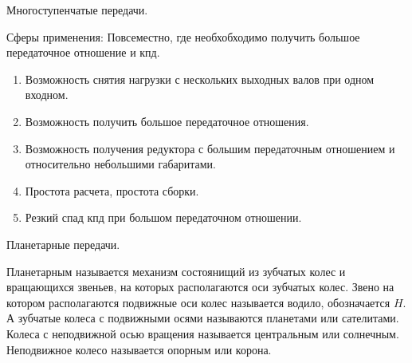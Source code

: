 \documentclass{article}
\begin{document}
Многоступенчатые передачи.

Сферы применения:
Повсеместно, где необхобходимо получить большое передаточное отношение и кпд.

\begin{enumerate}
	\item Возможность снятия нагрузки с нескольких выходных валов при одном входном.
	\item Возможность получить большое передаточное отношения.
	\item Возможность получения редуктора с большим передаточным отношением и относительно небольшими габаритами.
	\item Простота расчета, простота сборки.
	\item Резкий спад кпд при большом передаточном отношении.
\end{enumerate}

Планетарные передачи.

Планетарным называется механизм состоянищий из зубчатых колес и вращающихся звеньев, на которых располагаются оси зубчатых колес.
Звено на котором располагаются подвижные оси колес называется водило, обозначается $H$. А зубчатые колеса с подвижными осями называются планетами или сателитами.
Колеса с неподвижной осью вращения называется центральным или солнечным. Неподвижное колесо называется опорным или корона.
\end{document}
